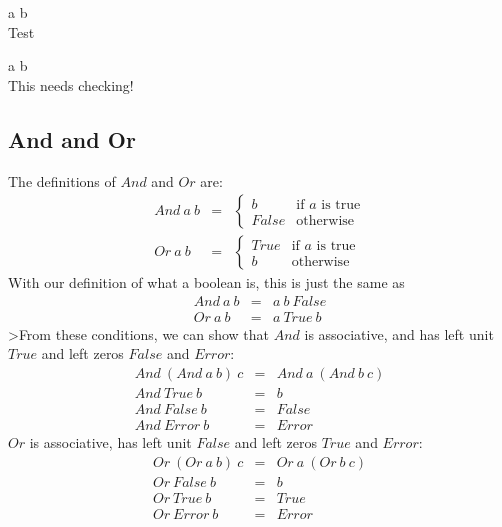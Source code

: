 \begin{teX}
\let\True=\First
\let\False=\Second
\let\Not=\Twiddle
\end{teX}

\def\Foo#1#2{#1 #2}

\True\Foo{a}{b} \\

Test 

\False\Foo{a}{b} \\

This needs checking!


\subsection{And and Or}

The definitions of $And$ and $Or$ are:
\begin{eqnarray*}
   And~a~b  &  
   =  &  
   \left\{
      \begin{array}{ll}
         b      &  \mbox{if $a$ is true}  \\
         False  &  \mbox{otherwise}
      \end{array}
   \right.
   \\
   Or~a~b  &  
   =  &  
   \left\{
      \begin{array}{ll}
         True   &  \mbox{if $a$ is true}  \\
         b      &  \mbox{otherwise}
      \end{array}
   \right.
\end{eqnarray*}
With our definition of what a boolean is, this is just the same as
\begin{eqnarray*}
   And~a~b  &  =  &  a~b~False  \\
    Or~a~b  &  =  &  a~True~b
\end{eqnarray*}
>From these conditions, we can show that $And$ is associative, and 
has left unit $True$ and left zeros $False$ and $Error$:
\begin{eqnarray*}
   And~(And~a~b)~c  &  =  &  And~a~(And~b~c)  \\
        And~True~b  &  =  &  b  \\
       And~False~b  &  =  &  False  \\
       And~Error~b  &  =  &  Error
\end{eqnarray*}
$Or$ is associative, has left unit $False$ and left zeros $True$ and $Error$:
\begin{eqnarray*}
   Or~(Or~a~b)~c  &  =  &  Or~a~(Or~b~c)  \\
      Or~False~b  &  =  &  b  \\
       Or~True~b  &  =  &  True  \\
      Or~Error~b  &  =  &  Error
\end{eqnarray*}
